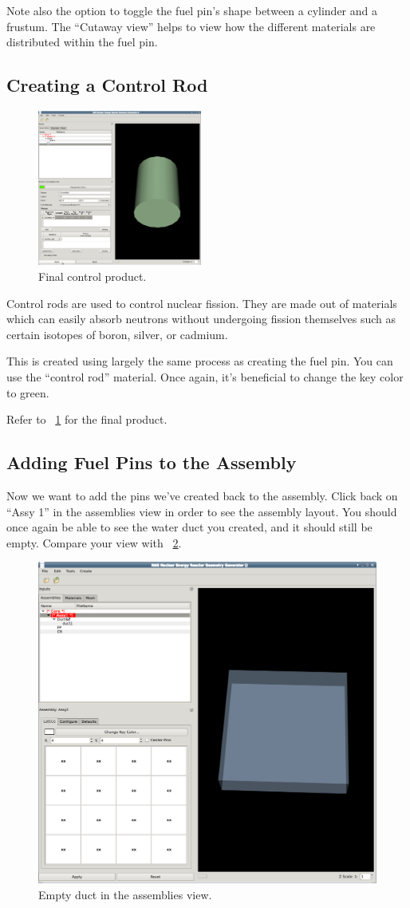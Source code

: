 Note also the option to toggle the fuel pin's shape between a cylinder and a frustum.  The ``Cutaway view'' helps to view how the different materials are distributed within the fuel pin.

\subsection{Creating a Control Rod}
\begin{figure}
  \begin{center}
    \includegraphics[width=0.48\textwidth]{Images/rect-7.png}
  \end{center}
  \caption{Final control product.}
  \label{fig:Rect7}
\end{figure}
Control rods are used to control nuclear fission. They are made out of materials which can easily absorb neutrons without undergoing fission themselves such as certain isotopes of boron, silver, or cadmium.

This is created using largely the same process as creating the fuel pin.  You can use the ``control rod'' material.  Once again, it's beneficial to change the key color to green.

Refer to ~\ref{fig:Rect7} for the final product.
\clearpage
\subsection{Adding Fuel Pins to the Assembly}

Now we want to add the pins we've created back to the assembly.  Click back on ``Assy 1'' in the assemblies view in order to see the assembly layout.  You should once again be able to see the water duct you created, and it should still be empty.  Compare your view with ~\ref{fig:Rect8}.

\begin{figure}[htb]
\begin{center}
\includegraphics[width=0.4\linewidth]{Images/rect-8.png}
\caption{Empty duct in the assemblies view.}
\label{fig:Rect8}
\end{center}
\end{figure}

